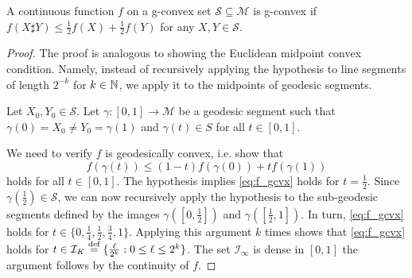 \documentclass[twoside,11pt]{article}
\begin{document}
\begin{lemma}
     A continuous function $f$ on a g-convex set $\mathcal{S}\subseteq \mathcal{M}$  is g-convex if $f\left(X \sharp Y \right) \leq \frac{1}{2} f\left(X\right)+\frac{1}{2} f\left(Y\right)$ for any $X,Y  \in \mathcal{S}$.
\end{lemma}
\begin{proof}
    The proof is analogous to showing the Euclidean midpoint convex condition. Namely, instead of recursively applying the hypothesis to line segments of length $2^{-k}$ for $k \in \mathbb{N}$, we apply it to the midpoints of geodesic segments.

    Let $X_0 ,Y_0 \in \mathcal{S}$. Let $\gamma:[0,1] \to \mathcal{M}$ be a geodesic segment such that $\gamma(0)=X_0 \neq Y_0 = \gamma(1)$ and $\gamma(t) \in S$ for all $t \in [0,1]$. 

    We need to verify $f$ is geodesically convex, i.e. show that 
    \begin{equation}\label{eq:f_gcvx}
    f(\gamma(t)) \leq (1-t)f(\gamma(0)) + t f(\gamma(1))    
    \end{equation}
    holds for all $t \in [0,1]$.
    The hypothesis implies \eqref{eq:f_gcvx} holds for $t = \frac{1}{2}$. Since $\gamma(\frac{1}{2}) \in \mathcal{S}$, we can now recursively apply the hypothesis to the sub-geodesic segments defined by the images $\gamma\left([0,\frac{1}{2}]\right)$ and $\gamma\left([\frac{1}{2}, 1]\right)$. In turn, \eqref{eq:f_gcvx} holds for $t \in \{0, \frac{1}{4}, \frac{1}{2}, \frac{3}{4}, 1\}$. Applying this argument $k$ times shows that \eqref{eq:f_gcvx} holds for $t \in \mathcal{I}_K \stackrel{\text{def}}{=} \{\frac{\ell}{2^k}: 0 \leq \ell \leq 2^k \}$. The set $\mathcal{I}_\infty$ is dense in $[0,1]$ the argument follows by the continuity of $f$. 
\end{proof}
\end{document}
